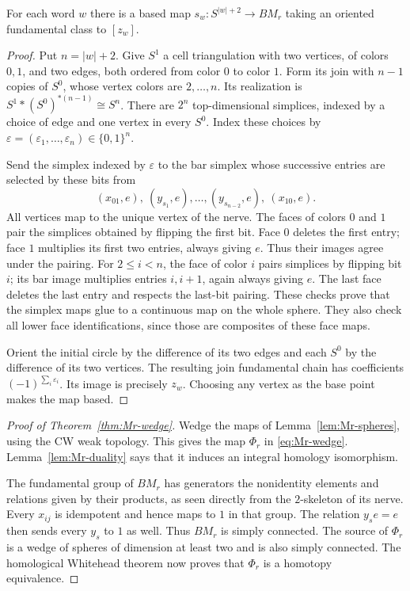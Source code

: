 \begin{lemma}\label{lem:Mr-spheres}
For each word $w$ there is a based map
$s_w:S^{|w|+2}\to BM_r$ taking an oriented fundamental class to $[z_w]$.
\end{lemma}
\begin{proof}
Put $n=|w|+2$.  Give $S^1$ a cell triangulation with two vertices, of
colors $0,1$, and two edges, both ordered from color $0$ to color $1$.
Form its join with $n-1$ copies of $S^0$, whose vertex colors are
$2,\ldots,n$.  Its realization is
$S^1*(S^0)^{*(n-1)}\cong S^n$.  There are $2^n$ top-dimensional
simplices, indexed by a choice of edge and one vertex in every $S^0$.
Index these choices by $\varepsilon=(\varepsilon_1,\ldots,
\varepsilon_n)\in\{0,1\}^n$.

Send the simplex indexed by $\varepsilon$ to the bar simplex whose
successive entries are selected by these bits from
\[
 (x_{01},e),\ (y_{s_1},e),\ldots,
                (y_{s_{n-2}},e),\ (x_{10},e).
\]
All vertices map to the unique vertex of the nerve.  The faces of
colors $0$ and $1$ pair the simplices obtained by flipping the first
bit.  Face $0$ deletes the first entry; face $1$ multiplies its first
two entries, always giving $e$.  Thus their images agree under the
pairing.  For $2\leq i<n$, the face of color $i$ pairs simplices by
flipping bit $i$; its bar image multiplies entries $i,i+1$, again
always giving $e$.  The last face deletes the last entry and respects
the last-bit pairing.  These checks prove that the simplex maps glue
to a continuous map on the whole sphere.  They also check all lower
face identifications, since those are composites of these face maps.

Orient the initial circle by the difference of its two edges and each
$S^0$ by the difference of its two vertices.  The resulting join
fundamental chain has coefficients $(-1)^{\sum_i\varepsilon_i}$.
Its image is precisely $z_w$.  Choosing any vertex as the base point
makes the map based.
\end{proof}

\begin{proof}[Proof of Theorem~\ref{thm:Mr-wedge}]
Wedge the maps of Lemma~\ref{lem:Mr-spheres}, using the CW weak topology.
This gives the map $\Phi_r$ in \eqref{eq:Mr-wedge}.
Lemma~\ref{lem:Mr-duality} says that it induces an integral homology
isomorphism.

The fundamental group of $BM_r$ has generators the nonidentity
elements and relations given by their products, as seen directly from
the $2$-skeleton of its nerve.  Every $x_{ij}$ is idempotent and hence
maps to $1$ in that group.  The relation $y_se=e$ then sends every
$y_s$ to $1$ as well.  Thus $BM_r$ is simply connected.  The source of
$\Phi_r$ is a wedge of spheres of dimension at least two and is also
simply connected.  The homological Whitehead theorem now proves that
$\Phi_r$ is a homotopy equivalence.
\end{proof}

